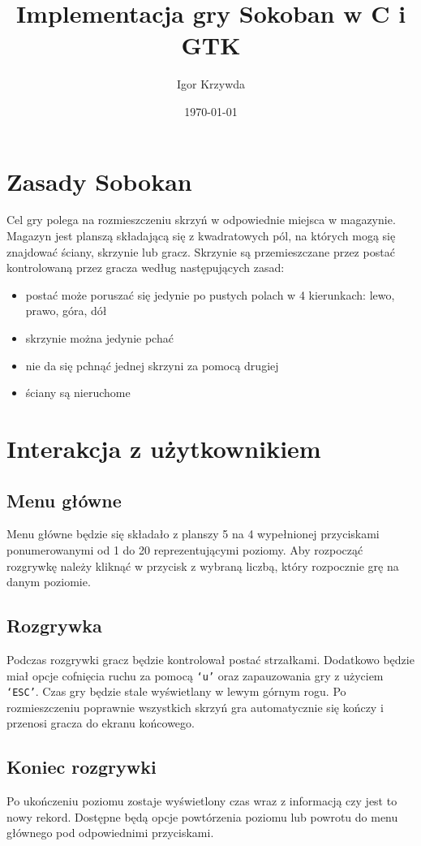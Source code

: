 \documentclass[9pt]{article}
\title{Implementacja gry Sokoban w C i GTK}
\author{Igor Krzywda}
\date{\today}
\begin{document}
\maketitle

\section*{Zasady Sobokan}
Cel gry polega na rozmieszczeniu skrzyń w odpowiednie miejsca w magazynie. Magazyn
jest planszą składającą się z kwadratowych pól, na których mogą się znajdować
ściany, skrzynie lub gracz.
Skrzynie są przemieszczane przez postać kontrolowaną przez gracza według 
następujących zasad:
\begin{itemize}
    \item postać może poruszać się jedynie po pustych polach w 4 kierunkach:
        lewo, prawo, góra, dół
    \item skrzynie można jedynie pchać
    \item nie da się pchnąć jednej skrzyni za pomocą drugiej
    \item ściany są nieruchome
\end{itemize}

\section*{Interakcja z użytkownikiem}

\subsection*{Menu główne}
Menu główne będzie się składało z planszy 5 na 4 wypełnionej przyciskami
ponumerowanymi od 1 do 20 reprezentującymi poziomy. Aby rozpocząć rozgrywkę
należy kliknąć w przycisk z wybraną liczbą, który rozpocznie grę na danym 
poziomie.

\subsection*{Rozgrywka}
Podczas rozgrywki gracz będzie kontrolował postać strzałkami. 
Dodatkowo będzie miał opcje cofnięcia ruchu za pomocą \texttt{`u'} oraz 
zapauzowania gry z użyciem \texttt{`ESC'}. Czas gry będzie stale wyświetlany w 
lewym górnym rogu.
Po rozmieszczeniu poprawnie wszystkich skrzyń gra automatycznie się kończy i 
przenosi gracza do ekranu końcowego.

\subsection*{Koniec rozgrywki}
Po ukończeniu poziomu zostaje wyświetlony czas wraz z informacją czy jest to nowy
rekord. Dostępne będą opcje powtórzenia poziomu lub powrotu do menu głównego pod
odpowiednimi przyciskami.
\end{document}
